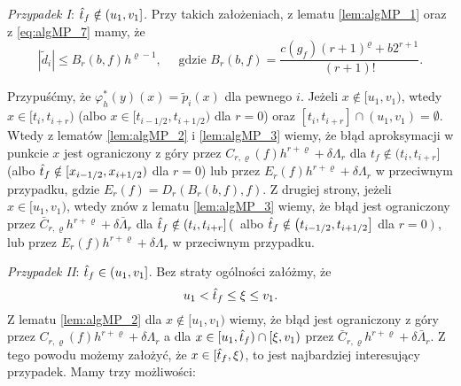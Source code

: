 \documentclass[oik, pdftex, robocza, man]{mgrwms}
\begin{document}
    \textit{Przypadek I}: $\hat{t}_{f} \notin (u_{1}, v_{1}]$.
    Przy takich założeniach, z lematu \eqref{lem:algMP_1} oraz z \eqref{eq:algMP_7} mamy, że
    \begin{equation*}
        |\tilde{d}_{i}| \leq B_{r}(b, f) h^{\varrho-1}, \quad \text{ gdzie } B_{r}(b, f)=\frac{c\left(g_{f}\right)(r+1)^{\varrho}+b 2^{r+1}}{(r+1) !}.
    \end{equation*}

    Przypuśćmy, że $\varphi_{h}^{*}(y)(x) = \tilde{p}_{i}(x)$ dla pewnego $i$. Jeżeli $x \notin [u_{1}, v_{1})$, wtedy $x \in [t_{i}, t_{i+r})$ (albo $x \in [t_{i-1/2}, t_{i+1/2})$ dla $r=0$) oraz $[t_{i}, t_{i+r}] \cap (u_{1}, v_{1}) = \emptyset$. Wtedy z lematów \ref{lem:algMP_2} i \ref{lem:algMP_3} wiemy, że błąd aproksymacji w punkcie $x$ jest ograniczony z góry przez $C_{r,\varrho}(f)h^{r+\varrho} + \delta \Lambda_{r}$ dla $t_{f} \notin (t_{i}, t_{i+r}]$ (albo $\hat{t}_{f} \notin [x_{i-1/2}, x_{i+1/2})$ dla $r=0$) lub przez $E_{r}(f)h^{r+\varrho} + \delta \Lambda_{r}$ w przeciwnym przypadku, gdzie $E_{r}(f) = D_{r}(B_{r}(b, f), f)$.
    Z drugiej strony, jeżeli $x \in [u_{1}, v_{1})$, wtedy znów z lematu \ref{lem:algMP_3} wiemy, że błąd jest ograniczony przez $\bar{C}_{r, \varrho} h^{r+\varrho}+\delta \bar{\Lambda}_{r}$ dla $\hat{t}_{f} \notin \left(t_{i}, t_{i+r}\right]\left(\right.$ albo $\hat{t}_{f} \notin\left(t_{i-1 / 2}, t_{i+1 / 2}\right]$ dla $\left.r=0\right)$, lub przez $E_{r}(f) h^{r+\varrho}+\delta \Lambda_{r}$ w przeciwnym przypadku.

    \textit{Przypadek II}: $\hat{t}_{f} \in (u_{1}, v_{1}]$.
    Bez straty ogólności załóżmy, że
    \begin{equation*}
        u_{1} < \hat{t}_{f} \leq \xi \leq v_{1}.
    \end{equation*}
    Z lematu \ref{lem:algMP_2} dla $x \notin [u_{1}, v_{1})$ wiemy, że błąd jest ograniczony z góry przez $C_{r, \varrho}(f) h^{r+\varrho}+\delta \Lambda_{r}$ a dla $x \in [u_{1}, \hat{t}_{f}) \cap [\xi, v_{1})$ przez $\bar{C}_{r, \varrho} h^{r+\varrho}+\delta \bar{\Lambda}_{r}$. Z tego powodu możemy założyć, że $x \in [\hat{t}_{f}, \xi)$, to jest najbardziej interesujący przypadek. Mamy trzy możliwości:
\end{document}
